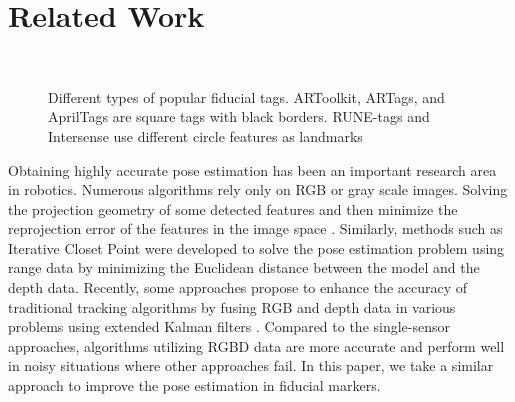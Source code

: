 \section{Related Work}
\label{sec:related}
\begin{figure}
\centering
{} \quad
{} \quad 
{} \\
 \quad
{}
\caption{Different types of popular fiducial tags. ARToolkit, ARTags, and AprilTags are square tags with black borders. RUNE-tags and Intersense use different circle features as landmarks}
\label{fig:tags}
\end{figure}
	Obtaining highly accurate pose estimation has been an important research area in robotics. Numerous algorithms rely only on RGB or gray scale images. Solving the projection geometry of some detected features and then minimize the reprojection error of the features in the image space \citep{grest2009comparison}.  Similarly, methods such as Iterative Closet Point \citep{besl1992method} were developed to solve the pose estimation problem using range data by minimizing the Euclidean distance between the model and the depth data. Recently, some approaches propose to enhance the accuracy of traditional tracking algorithms by fusing RGB and depth data in various problems using extended Kalman filters \citep{gedik2015rgbd, assa2014robust}. Compared to the single-sensor approaches, algorithms utilizing RGBD data are more accurate and perform well in noisy situations where other approaches fail. In this paper, we take a similar approach to improve the pose estimation in fiducial markers.
	
